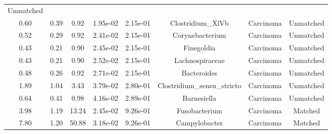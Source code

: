\documentclass[12pt,]{article}
\begin{document}
\begin{longtable}[]{@{}cccccccc@{}}
Unmatched\tabularnewline
0.60 & 0.39 & 0.92 & 1.95e-02 & 2.15e-01 & Clostridium\_XlVb & Carcinoma
& Unmatched\tabularnewline
0.52 & 0.29 & 0.92 & 2.41e-02 & 2.15e-01 & Corynebacterium & Carcinoma &
Unmatched\tabularnewline
0.43 & 0.21 & 0.90 & 2.45e-02 & 2.15e-01 & Finegoldia & Carcinoma &
Unmatched\tabularnewline
0.43 & 0.21 & 0.90 & 2.52e-02 & 2.15e-01 & Lachnospiraceae & Carcinoma &
Unmatched\tabularnewline
0.48 & 0.26 & 0.92 & 2.71e-02 & 2.15e-01 & Bacteroides & Carcinoma &
Unmatched\tabularnewline
1.89 & 1.04 & 3.43 & 3.79e-02 & 2.80e-01 & Clostridium\_sensu\_stricto &
Carcinoma & Unmatched\tabularnewline
0.64 & 0.41 & 0.98 & 4.16e-02 & 2.89e-01 & Barnesiella & Carcinoma &
Unmatched\tabularnewline
3.98 & 1.19 & 13.24 & 2.45e-02 & 9.26e-01 & Fusobacterium & Carcinoma &
Matched\tabularnewline
7.80 & 1.20 & 50.88 & 3.18e-02 & 9.26e-01 & Campylobacter & Carcinoma &
Matched\tabularnewline
\bottomrule
\end{longtable}

\normalsize

\newpage
\end{document}
